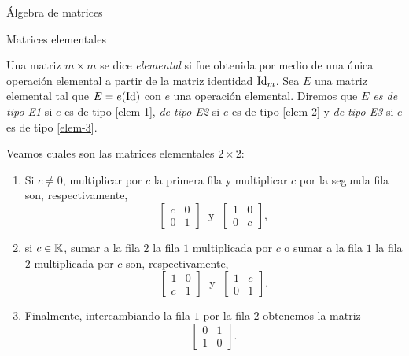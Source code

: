 \begin{chapter}{\'Algebra de matrices}
\begin{section}{Matrices elementales}
            \begin{definicion} Una matriz $m \times m$  se dice  \textit{elemental} si fue obtenida por medio de una única operación elemental a partir de la matriz identidad $\operatorname{Id}_m$. Sea $E$ una matriz elemental tal que $E= e(\operatorname{Id})$ con $e$ una operación elemental. Diremos que \textit{$E$ es de tipo E1} si $e$ es de tipo \ref{elem-1}, \textit{de tipo E2} si $e$ es de tipo \ref{elem-2} y \textit{de tipo E3} si $e$ es de tipo \ref{elem-3}.
            \end{definicion}

            \begin{ejemplo*} Veamos cuales son las matrices elementales  $2 \times 2$:
                \begin{enumerate}
                    \item Si $c \not=0$, multiplicar por  $c$ la primera fila y multiplicar $c$ por la segunda fila son, respectivamente,
                    \begin{equation*}
                    \begin{bmatrix} c& 0\\ 0&1\end{bmatrix}\;\text{ y }\; \begin{bmatrix} 1& 0\\ 0&c\end{bmatrix},
                    \end{equation*}
                    \item si  $c \in \mathbb K$, sumar a la fila $2$ la fila $1$ multiplicada por $c$ o sumar a la fila $1$ la fila $2$ multiplicada por $c$ son, respectivamente,
                    \begin{equation*}
                    \begin{bmatrix} 1& 0\\ c&1\end{bmatrix}\;\text{ y }\; \begin{bmatrix} 1& c\\ 0&1\end{bmatrix}.
                    \end{equation*}
                    \item Finalmente, intercambiando la fila $1$ por la fila $2$ obtenemos la matriz
                    \begin{equation*}
                    \begin{bmatrix} 0& 1\\ 1&0\end{bmatrix}.
                    \end{equation*}
                \end{enumerate}
            \end{ejemplo*}


\end{section}
\end{chapter}
